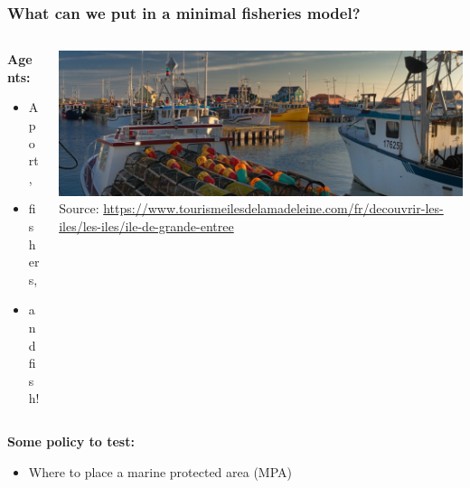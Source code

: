\documentclass[table, 14pt, aspectratio=169]{beamer}
\newcommand{\hl}[1]{\textcolor{OxfordBlue}{\textbf{#1}}}
\begin{document}
\begin{frame}[t]
\begin{columns}[T]
\begin{column}{0.425\textwidth}
    \end{column}
  \end{columns}
\end{frame}


\begin{frame}[t]\frametitle{What can we put in a minimal fisheries model?}
  \large
  \vfill
  \begin{columns}[T]
    \begin{column}{0.3\textwidth}
      \hl{Agents:}
      \begin{itemize}
        \item A port,
        \item fishers,
        \item and fish!
      \end{itemize}
    \end{column}
    \begin{column}{0.6\textwidth}
      \includegraphics[width=\textwidth]{images/port.jpg}\\
      \tiny Source: \url{https://www.tourismeilesdelamadeleine.com/fr/decouvrir-les-iles/les-iles/ile-de-grande-entree}
    \end{column}
  \end{columns}
  \vfill
      \hl{Some policy to test:}
      \begin{itemize}
        \item Where to place a marine protected area (MPA)
      \end{itemize}
\end{frame}
\end{document}
